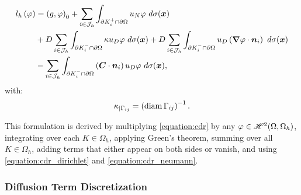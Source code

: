 \begin{align}
    l_h \left( \varphi \right)  &= \left( g, \varphi \right)_0 + \sum_{i \in \mathcal{J}_h} \int_{\partial K_i^+ \cap \partial \Omega} u_N \varphi ~ d \sigma(\bm{x}) \label{equation:cdr_lh} \\
    &+ D \sum_{i \in \mathcal{J}_h} \int_{\partial K_i^- \cap \partial \Omega} \kappa u_D \varphi ~ d \sigma(\bm{x}) + D \sum_{i \in \mathcal{J}_h} \int_{\partial K_i^- \cap \partial \Omega} u_D \left( \bm{\nabla} \varphi \cdot \bm{n}_i \right) ~ d \sigma(\bm{x}) \notag \\
    &- \sum_{i \in \mathcal{J}_h} \int_{\partial K_i^- \cap \partial \Omega} \left( \bm{C} \cdot \bm{n}_i \right) u_D \varphi ~ d \sigma(\bm{x}) \notag,
\end{align}
with:
\begin{gather}
    \kappa_{\mid \Gamma_{ij}} = \left( \operatorname*{diam} \Gamma_{ij} \right)^{-1}.
\end{gather}

This formulation is derived by multiplying \eqref{equation:cdr} by any $\varphi \in \mathscr{H}^{2}(\Omega, \Omega_h)$, integrating over each $K \in \Omega_h$, applying Green's theorem, summing over all $K \in \Omega_h$, adding terms that either appear on both sides or vanish, and using \eqref{equation:cdr_dirichlet} and \eqref{equation:cdr_neumann}. %

\newpage
\subsubsection{Diffusion Term Discretization}

